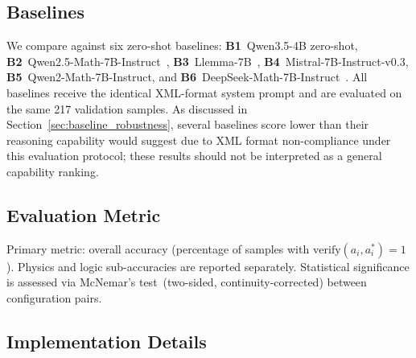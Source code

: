 \documentclass[cmc,journal,article,submit,moreauthors,pdftex]{Definitions/tsp}
\newcommand{\basemodelname}{Qwen3.5-4B}
\begin{document}
\subsection{Baselines}

We compare against six zero-shot baselines:
\textbf{B1}~\basemodelname{} zero-shot,
\textbf{B2}~Qwen2.5-Math-7B-Instruct~\cite{Yang2024},
\textbf{B3}~Llemma-7B~\cite{Azerbayev2024},
\textbf{B4}~Mistral-7B-Instruct-v0.3,
\textbf{B5}~Qwen2-Math-7B-Instruct, and
\textbf{B6}~DeepSeek-Math-7B-Instruct~\cite{Shao2024}.
All baselines receive the identical XML-format system prompt and are
evaluated on the same 217 validation samples.
As discussed in Section~\ref{sec:baseline_robustness}, several baselines
score lower than their
reasoning capability would suggest due to XML format non-compliance
under this evaluation protocol; these results should not be interpreted
as a general capability ranking.

\subsection{Evaluation Metric}

Primary metric: overall accuracy (percentage of samples with
$\mathrm{verify}(a_i, a_i^*) = 1$).
Physics and logic sub-accuracies are reported separately.
Statistical significance is assessed via McNemar's test~(two-sided,
continuity-corrected) between configuration pairs.

\subsection{Implementation Details}
\end{document}

